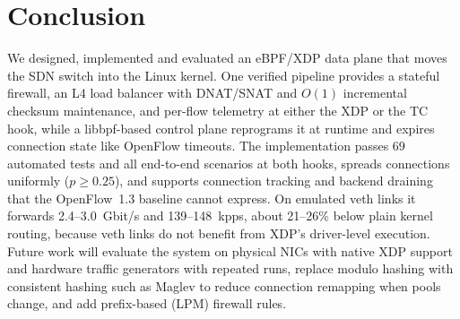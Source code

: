 \documentclass[conference]{IEEEtran}
\begin{document}
\section{Conclusion}
We designed, implemented and evaluated an eBPF/XDP data plane that moves the
SDN switch into the Linux kernel. One verified pipeline provides a stateful
firewall, an L4 load balancer with DNAT/SNAT and $O(1)$ incremental checksum
maintenance, and per-flow telemetry at either the XDP or the TC hook, while a
libbpf-based control plane reprograms it at runtime and expires connection
state like OpenFlow timeouts. The implementation passes 69 automated tests and
all end-to-end scenarios at both hooks, spreads connections uniformly
($p \ge 0.25$), and supports connection tracking and backend draining that the
OpenFlow~1.3 baseline cannot express. On emulated veth links it forwards
2.4--3.0~Gbit/s and 139--148~kpps, about 21--26\% below plain kernel routing,
because veth links do not benefit from XDP's driver-level execution. Future
work will evaluate the system on physical NICs with native XDP support and
hardware traffic generators with repeated runs, replace modulo hashing with
consistent hashing such as Maglev \cite{eisenbud2016maglev} to reduce
connection remapping when pools change, and add prefix-based (LPM) firewall
rules.
\end{document}
